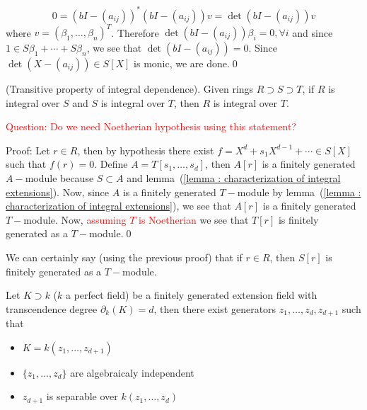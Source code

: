 \begin{itemize}
\begin{equation}
      0 =  (bI-(a_{ij}))^*(bI-(a_{ij}))v = \det(bI-(a_{ij}))v
    \end{equation}
    where $v=(\beta_1,\dots,\beta_n)^T$. Therefore $\det(bI-(a_{ij}))\beta_i=0,\forall i$ and since 
    $1\in S\beta_1+\cdots+S\beta_n$, we see that $\det(bI-(a_{ij}))=0$. Since $\det(X-(a_{ij}))\in S[X]$ is monic, we 
    are done.\qed 
    \begin{corollary}\label{corollary : transitive property integral dependence}
        (Transitive property of integral dependence). Given rings $R \supset S\supset T$, if $R$ is integral over $S$ and 
        $S$ is integral over $T$, then $R$ is integral over $T$.\par 
        \textcolor{red}{Question: Do we need Noetherian hypothesis using this statement?}
    \end{corollary}
    Proof: Let $r\in R$, then by hypothesis there exist $f=X^d+s_1X^{d-1}+\cdots\in S[X]$ such that $f(r)=0$.
    Define $A=T[s_1,\dots,s_d]$, then $A[r]$ is a finitely generated $A-$module because $S\subset A$ and lemma~(\ref{lemma : characterization of integral extensions}). 
    Now, since $A$ is a finitely generated $T-$module by lemma~(\ref{lemma : characterization of integral extensions}),
    we see that $A[r]$ is a finitely generated $T-$module. Now, \textcolor{red}{assuming $T$ is Noetherian} we see that 
    $T[r]$ is finitely generated as a $T-$module.\qed

    \begin{remark}
        We can certainly say (using the previous proof) that if $r\in R$, then $S[r]$ is finitely generated 
        as a $T-$module.
    \end{remark}

    \begin{lemma}\label{lemma : extension field transcendence degree}
        Let $K\supset k$ ($k$ a perfect field) be a finitely generated extension field with transcendence degree $\partial_k(K)=d$, then 
        there exist generators $z_1,\dots,z_d,z_{d+1}$ such that 
        \begin{itemize}
            \item[(1)] $K=k(z_1,\dots,z_{d+1})$
            \item[(2)] $\{z_1,\dots,z_d\}$ are algebraicaly independent
            \item[(3)] $z_{d+1}$ is separable over $k(z_1,\dots, z_d)$ 
        \end{itemize} 
    \end{lemma}  
\end{itemize}

